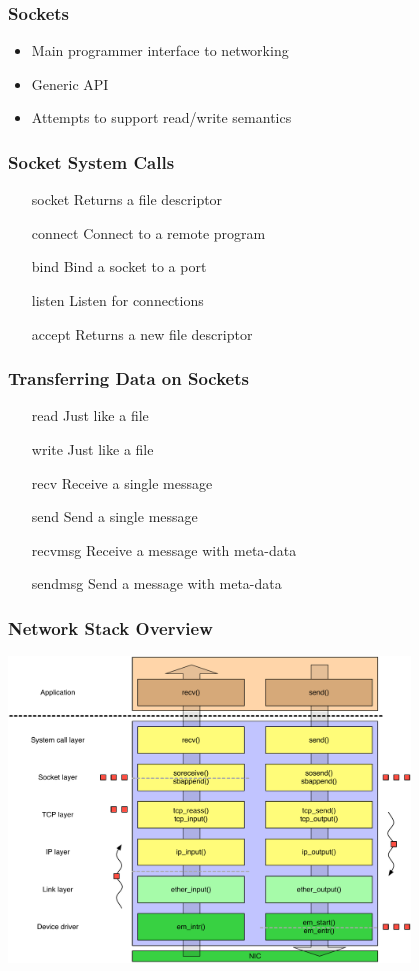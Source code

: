 \documentclass[pdftex]{beamer} %
\begin{document}
\begin{frame}
  \frametitle{Sockets}
  \begin{itemize}
  \item Main programmer interface to networking
  \item Generic API
  \item Attempts to support read/write semantics
  \end{itemize}
\end{frame}

\begin{frame}
  \frametitle{Socket System Calls}
  \begin{enumerate}
  \item [socket] Returns a file descriptor
  \item [connect] Connect to a remote program
  \item [bind] Bind a socket to a port
  \item [listen] Listen for connections
  \item [accept] Returns a new file descriptor
  \end{enumerate}
\end{frame}

\begin{frame}
  \frametitle{Transferring Data on Sockets}
  \begin{enumerate}
  \item [read] Just like a file
  \item [write] Just like a file
  \item [recv] Receive a single message
  \item [send] Send a single message
  \item [recvmsg] Receive a message with meta-data
  \item [sendmsg] Send a message with meta-data
  \end{enumerate}
\end{frame}

\begin{frame}
  \frametitle{Network Stack Overview}
\centering
\includegraphics[width=0.8\textwidth]{../../figures/network-in-out.pdf}
\end{frame}
\end{document}

